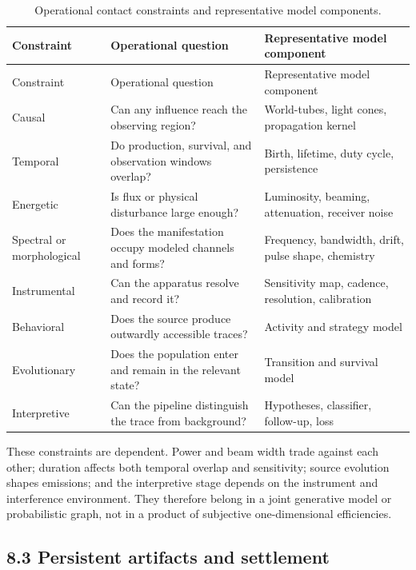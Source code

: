 \documentclass[11pt,a4paper]{article}
\begin{document}
\begin{longtable}[]{@{}Q{0.15\textwidth}Q{0.33\textwidth}Q{0.40\textwidth}@{}}
\caption{Operational contact constraints and representative model components.}\label{tab:contact}\\
\toprule\noalign{}
Constraint & Operational question & Representative model component \\
\midrule\noalign{}
\endfirsthead
\toprule\noalign{}
Constraint & Operational question & Representative model component \\
\midrule\noalign{}
\endhead
\bottomrule\noalign{}
\endlastfoot
Causal & Can any influence reach the observing region? & World-tubes, light cones, propagation kernel \\
Temporal & Do production, survival, and observation windows overlap? & Birth, lifetime, duty cycle, persistence \\
Energetic & Is flux or physical disturbance large enough? & Luminosity, beaming, attenuation, receiver noise \\
Spectral or morphological & Does the manifestation occupy modeled channels and forms? & Frequency, bandwidth, drift, pulse shape, chemistry \\
Instrumental & Can the apparatus resolve and record it? & Sensitivity map, cadence, resolution, calibration \\
Behavioral & Does the source produce outwardly accessible traces? & Activity and strategy model \\
Evolutionary & Does the population enter and remain in the relevant state? & Transition and survival model \\
Interpretive & Can the pipeline distinguish the trace from background? & Hypotheses, classifier, follow-up, loss \\
\end{longtable}

These constraints are dependent. Power and beam width trade against each other; duration affects both temporal overlap and sensitivity; source evolution shapes emissions; and the interpretive stage depends on the instrument and interference environment. They therefore belong in a joint generative model or probabilistic graph, not in a product of subjective one-dimensional efficiencies.

\subsection{8.3 Persistent artifacts and settlement}\label{83-persistent-artifacts-and-settlement}
\end{document}
